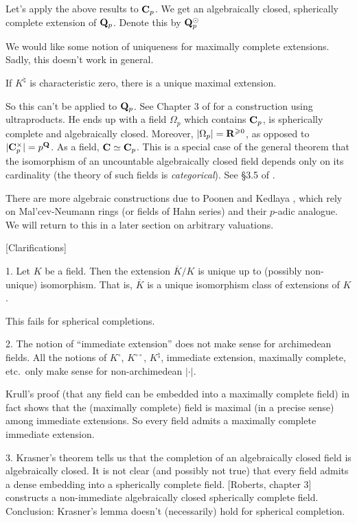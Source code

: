 \begin{example}
Let's apply the above results to $\mathbf{C}_p$. We get an algebraically closed, 
spherically complete extension of $\mathbf{Q}_p$. Denote this by $\mathbf{Q}_p^\odot$
\end{example}

We would like some notion of uniqueness for maximally complete extensions. 
Sadly, this doesn't work in general. 

\begin{theorem}[Kaplansky]
If $K^\natural$ is characteristic zero, there is a unique maximal extension. 
\end{theorem}

So this can't be applied to $\mathbf{Q}_p$. See Chapter 3 of \cite{robert-2000} for 
a construction using ultraproducts. He ends up with a field $\Omega_p$ which 
contains $\mathbf{C}_p$, is spherically complete and algebraically closed. Moreover, 
$|\Omega_p|=\mathbf{R}^{\geqslant 0}$, as opposed to $|\mathbf{C}_p^\times|=p^{\mathbf{Q}}$. As a 
field, $\mathbf{C}\simeq \mathbf{C}_p$. This is a special case of the general theorem that 
the isomorphism of an uncountable algebraically closed field depends only on 
its cardinality (the theory of such fields is \emph{categorical}). See 
\S 3.5 of \cite{robert-2000}. 

There are more algebraic constructions due to Poonen \cite{poonen-1993} and 
Kedlaya \cite{kedlaya-2001}, which rely on Mal'cev-Neumann rings (or fields of 
Hahn series) and their $p$-adic analogue. We will return to this in a later 
section on arbitrary valuations. 

[Clarifications]

1. Let $K$ be a field. Then the extension $\overline K/K$ is unique up to 
(possibly non-unique) isomorphism. That is, $\overline K$ is a unique 
isomorphism class of extensions of $K$. 

This fails for spherical completions. 

2. The notion of ``immediate extension'' does not make sense for archimedean 
fields. All the notions of $K^\circ$, $K^{\circ\circ}$, $K^\natural$, 
immediate extension, maximally complete, etc.~only make sense for non-archimedean 
$|\cdot|$. 

Krull's proof (that any field can be embedded into a maximally complete 
field) in fact shows that the (maximally complete) field is maximal (in a 
precise sense) among immediate extensions. So every field admits a maximally 
complete immediate extension. 

3. Krasner's theorem tells us that the completion of an algebraically closed 
field is algebraically closed. It is not clear (and possibly not true) that 
every field admits a dense embedding into a spherically complete field. 
[Roberts, chapter 3] constructs a non-immediate algebraically closed spherically 
complete field. Conclusion: Krasner's lemma doesn't (necessarily) hold for 
spherical completion. 





